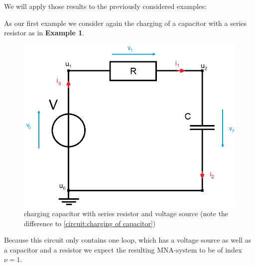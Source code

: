 We will apply those results to the previously considered examples: 

\begin{example1}
	\label{ex:Index_Analysis}
	As our first example we consider again the charging of a capacitor with a series resistor as in \textbf{Example 1}.
	\begin{figure}[H]
		\centering
		\includegraphics[scale = 0.4]{pictures/Example1_simple_p2.png}
		\caption{charging capacitor with series resistor and voltage source (note the difference to \ref{circuit:charging of capacitor})} 
	\end{figure}
	Because this circuit only contains one loop, which has a voltage source as well as a capacitor and a resistor we expect the resulting MNA-system to be of index $\nu=1$. 
	

\end{example1}
